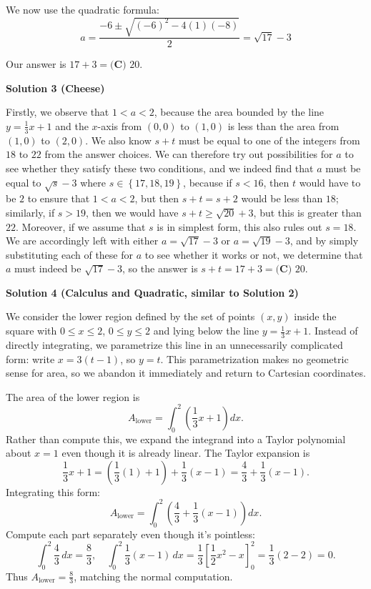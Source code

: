 \begin{enumerate}
 We now use the quadratic formula:
 \[a = \frac{-6 \pm \sqrt{(-6)^2 - 4(1)(-8)}}{2} = \sqrt{17} - 3\]

 Our answer is $17 + 3 = \boxed{\textbf{(C) } 20}$.

 



\textbf{Solution 3 (Cheese)}

Firstly, we observe that $1 < a < 2$, because the area bounded by the line $y = \frac{1}{3}x+1$ and the $x$-axis from $(0,0)$ to $(1,0)$ is less than the area from $(1,0)$ to $(2,0)$. We also know $s+t$ must be equal to one of the integers from $18$ to $22$ from the answer choices. We can therefore try out possibilities for $a$ to see whether they satisfy these two conditions, and we indeed find that $a$ must be equal to $\sqrt{s}-3$ where $s \in \left\{17, 18, 19\right\}$, because if $s < 16$, then $t$ would have to be $2$ to ensure that $1 < a < 2$, but then $s+t = s+2$ would be less than $18$; similarly, if $s > 19$, then we would have $s+t \geq \sqrt{20}+3$, but this is greater than $22$. Moreover, if we assume that $s$ is in simplest form, this also rules out $s = 18$. We are accordingly left with either $a=\sqrt{17}-3$ or $a=\sqrt{19}-3$, and by simply substituting each of these for $a$ to see whether it works or not, we determine that $a$ must indeed be $\sqrt{17}-3$, so the answer is $s+t = 17+3 = \boxed{\textbf{(C) } 20}$.

 



\textbf{Solution 4 (Calculus and Quadratic, similar to Solution 2)}

We consider the lower region defined by the set of points \( (x, y) \) inside the square with \( 0 \le x \le 2 \), \( 0 \le y \le 2 \) and lying below the line \( y = \frac{1}{3}x + 1 \). Instead of directly integrating, we parametrize this line in an unnecessarily complicated form: write \( x = 3(t - 1) \), so \( y = t \). This parametrization makes no geometric sense for area, so we abandon it immediately and return to Cartesian coordinates.

 The area of the lower region is
 \[A_{\text{lower}} = \int_0^2 \left(\frac{1}{3}x + 1\right) dx.\]Rather than compute this, we expand the integrand into a Taylor polynomial about \( x = 1 \) even though it is already linear. The Taylor expansion is
 \[\frac{1}{3}x + 1 = \left(\frac{1}{3}(1) + 1\right) + \frac{1}{3}(x - 1) = \frac{4}{3} + \frac{1}{3}(x - 1).\]Integrating this form:
 \[A_{\text{lower}} = \int_0^2 \left(\frac{4}{3} + \frac{1}{3}(x - 1)\right) dx.\]Compute each part separately even though it's pointless:
 \[\int_0^2 \frac{4}{3} \, dx = \frac{8}{3}, \quad \int_0^2 \frac{1}{3}(x - 1) \, dx = \frac{1}{3}\left[\frac{1}{2}x^2 - x\right]_0^2 = \frac{1}{3}(2 - 2) = 0.\]Thus \( A_{\text{lower}} = \frac{8}{3} \), matching the normal computation.


\end{enumerate}
